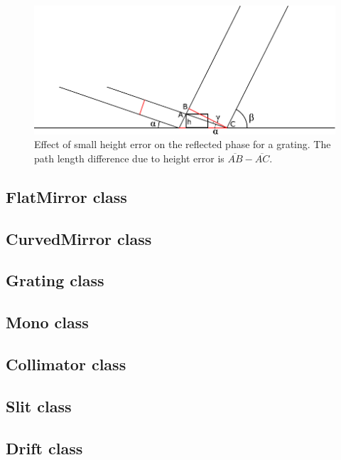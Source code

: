 \documentclass[11pt,fleqn]{article} %
\begin{document}
\begin{figure}[htb]
\begin{center}
\includegraphics[width=1.0\textwidth]{Figures/grating_phase_error.pdf}
\caption{Effect of small height error on the reflected phase for a grating. The path length difference due to height error is $\overline{AB} - \overline{AC}$.}
\label{fig:grating_phase_error}
\end{center}
\end{figure}

\subsection{FlatMirror class}
\label{FlatMirror}

\subsection{CurvedMirror class}
\label{CurvedMirror}

\subsection{Grating class}

\subsection{Mono class}

\subsection{Collimator class}

\subsection{Slit class}

\subsection{Drift class}
\end{document}
